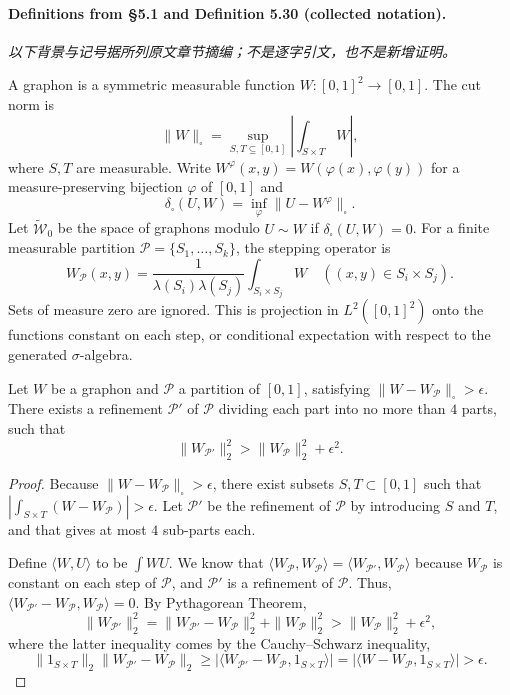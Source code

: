 \paragraph{Definitions from \S5.1 and Definition 5.30 (collected notation).}
\noindent\textit{以下背景与记号据所列原文章节摘编；不是逐字引文，也不是新增证明。}\par
A graphon is a symmetric measurable function $W:[0,1]^2\to[0,1]$. The cut norm is
\[\|W\|_\square=\sup_{S,T\subseteq[0,1]}\left|\int_{S\times T}W\right|,\]
where $S,T$ are measurable. Write $W^\varphi(x,y)=W(\varphi(x),\varphi(y))$ for a measure-preserving bijection $\varphi$ of $[0,1]$ and
\[\delta_\square(U,W)=\inf_\varphi\|U-W^\varphi\|_\square.\]
Let $\widetilde{\mathcal W}_0$ be the space of graphons modulo $U\sim W$ if $\delta_\square(U,W)=0$. For a finite measurable partition $\mathcal P=\{S_1,\ldots,S_k\}$, the stepping operator is
\[W_{\mathcal P}(x,y)=\frac1{\lambda(S_i)\lambda(S_j)}\int_{S_i\times S_j}W\quad ((x,y)\in S_i\times S_j).\]
Sets of measure zero are ignored. This is projection in $L^2([0,1]^2)$ onto the functions constant on each step, or conditional expectation with respect to the generated $\sigma$-algebra.
\begin{lemma}
Let $W$ be a graphon and $\mathcal P$ a partition of $[0,1]$, satisfying $\|W-W_{\mathcal P}\|_\square>\epsilon$. There exists a refinement $\mathcal P'$ of $\mathcal P$ dividing each part into no more than $4$ parts, such that
\[\|W_{\mathcal P'}\|_2^2>\|W_{\mathcal P}\|_2^2+\epsilon^2.\]
\end{lemma}
\begin{proof}
Because $\|W-W_{\mathcal P}\|_\square>\epsilon$, there exist subsets $S,T\subset[0,1]$ such that $|\int_{S\times T}(W-W_{\mathcal P})|>\epsilon$. Let $\mathcal P'$ be the refinement of $\mathcal P$ by introducing $S$ and $T$, and that gives at most $4$ sub-parts each.

Define $\langle W,U\rangle$ to be $\int WU$. We know that $\langle W_{\mathcal P},W_{\mathcal P}\rangle=\langle W_{\mathcal P'},W_{\mathcal P}\rangle$ because $W_{\mathcal P}$ is constant on each step of $\mathcal P$, and $\mathcal P'$ is a refinement of $\mathcal P$. Thus, $\langle W_{\mathcal P'}-W_{\mathcal P},W_{\mathcal P}\rangle=0$. By Pythagorean Theorem,
\[\|W_{\mathcal P'}\|_2^2=\|W_{\mathcal P'}-W_{\mathcal P}\|_2^2+\|W_{\mathcal P}\|_2^2>\|W_{\mathcal P}\|_2^2+\epsilon^2,\]
where the latter inequality comes by the Cauchy--Schwarz inequality,
\[\|1_{S\times T}\|_2\|W_{\mathcal P'}-W_{\mathcal P}\|_2\geq|\langle W_{\mathcal P'}-W_{\mathcal P},1_{S\times T}\rangle|=|\langle W-W_{\mathcal P},1_{S\times T}\rangle|>\epsilon.\]
\end{proof}
